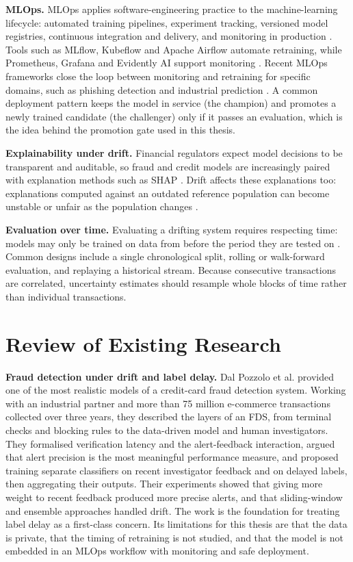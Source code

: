\textbf{MLOps.} MLOps applies software-engineering practice to the machine-learning lifecycle: automated training pipelines, experiment tracking, versioned model registries, continuous integration and delivery, and monitoring in production \cite{pulicharla2019,kodakandla2024}. Tools such as MLflow, Kubeflow and Apache Airflow automate retraining, while Prometheus, Grafana and Evidently AI support monitoring \cite{pulicharla2019}. Recent MLOps frameworks close the loop between monitoring and retraining for specific domains, such as phishing detection \cite{reda2025} and industrial prediction \cite{wong2025}. A common deployment pattern keeps the model in service (the champion) and promotes a newly trained candidate (the challenger) only if it passes an evaluation, which is the idea behind the promotion gate used in this thesis.

\textbf{Explainability under drift.} Financial regulators expect model decisions to be transparent and auditable, so fraud and credit models are increasingly paired with explanation methods such as SHAP \cite{uddin2026,alessi2026}. Drift affects these explanations too: explanations computed against an outdated reference population can become unstable or unfair as the population changes \cite{john2025}.

\textbf{Evaluation over time.} Evaluating a drifting system requires respecting time: models may only be trained on data from before the period they are tested on \cite{menezes2025}. Common designs include a single chronological split, rolling or walk-forward evaluation, and replaying a historical stream. Because consecutive transactions are correlated, uncertainty estimates should resample whole blocks of time rather than individual transactions.

\section{Review of Existing Research}

\textbf{Fraud detection under drift and label delay.} Dal Pozzolo et al. \cite{dalpozzolo2018} provided one of the most realistic models of a credit-card fraud detection system. Working with an industrial partner and more than 75 million e-commerce transactions collected over three years, they described the layers of an FDS, from terminal checks and blocking rules to the data-driven model and human investigators. They formalised verification latency and the alert-feedback interaction, argued that alert precision is the most meaningful performance measure, and proposed training separate classifiers on recent investigator feedback and on delayed labels, then aggregating their outputs. Their experiments showed that giving more weight to recent feedback produced more precise alerts, and that sliding-window and ensemble approaches handled drift. The work is the foundation for treating label delay as a first-class concern. Its limitations for this thesis are that the data is private, that the timing of retraining is not studied, and that the model is not embedded in an MLOps workflow with monitoring and safe deployment.

